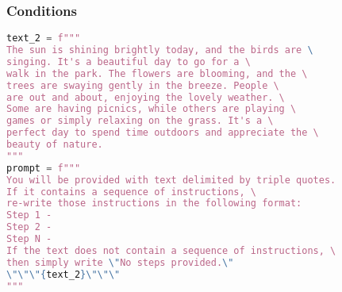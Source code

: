 \begin{frame}[fragile]\frametitle{Conditions}

{\tiny 
\begin{lstlisting}[language=Python]
text_2 = f"""
The sun is shining brightly today, and the birds are \
singing. It's a beautiful day to go for a \ 
walk in the park. The flowers are blooming, and the \ 
trees are swaying gently in the breeze. People \ 
are out and about, enjoying the lovely weather. \ 
Some are having picnics, while others are playing \ 
games or simply relaxing on the grass. It's a \ 
perfect day to spend time outdoors and appreciate the \ 
beauty of nature.
"""
prompt = f"""
You will be provided with text delimited by triple quotes. 
If it contains a sequence of instructions, \ 
re-write those instructions in the following format:
Step 1 - 
Step 2 -
Step N -
If the text does not contain a sequence of instructions, \ 
then simply write \"No steps provided.\"
\"\"\"{text_2}\"\"\"
"""
\end{lstlisting}
}
		
\end{frame}













